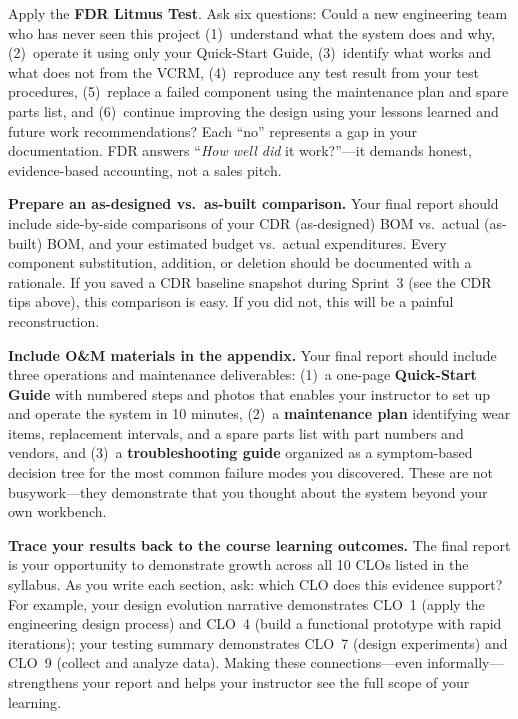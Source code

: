 \documentclass[11pt,letterpaper]{article}
\begin{document}
\begin{faqbox}
Apply the \textbf{FDR Litmus Test}. Ask six questions: Could a new engineering team who has never seen this project (1)~understand what the system does and why, (2)~operate it using only your Quick-Start Guide, (3)~identify what works and what does not from the VCRM, (4)~reproduce any test result from your test procedures, (5)~replace a failed component using the maintenance plan and spare parts list, and (6)~continue improving the design using your lessons learned and future work recommendations? Each ``no'' represents a gap in your documentation. FDR answers ``\textit{How well did} it work?''---it demands honest, evidence-based accounting, not a sales pitch.
\end{faqbox}

\begin{protip}
\textbf{Prepare an as-designed vs.\ as-built comparison.} Your final report should include side-by-side comparisons of your CDR (as-designed) BOM vs.\ actual (as-built) BOM, and your estimated budget vs.\ actual expenditures. Every component substitution, addition, or deletion should be documented with a rationale. If you saved a CDR baseline snapshot during Sprint~3 (see the CDR tips above), this comparison is easy. If you did not, this will be a painful reconstruction.
\end{protip}

\begin{tipbox}
\textbf{Include O\&M materials in the appendix.} Your final report should include three operations and maintenance deliverables: (1)~a one-page \textbf{Quick-Start Guide} with numbered steps and photos that enables your instructor to set up and operate the system in 10 minutes, (2)~a \textbf{maintenance plan} identifying wear items, replacement intervals, and a spare parts list with part numbers and vendors, and (3)~a \textbf{troubleshooting guide} organized as a symptom-based decision tree for the most common failure modes you discovered. These are not busywork---they demonstrate that you thought about the system beyond your own workbench.
\end{tipbox}

\begin{protip}
\textbf{Trace your results back to the course learning outcomes.} The final report is your opportunity to demonstrate growth across all 10 CLOs listed in the syllabus. As you write each section, ask: which CLO does this evidence support? For example, your design evolution narrative demonstrates CLO~1 (apply the engineering design process) and CLO~4 (build a functional prototype with rapid iterations); your testing summary demonstrates CLO~7 (design experiments) and CLO~9 (collect and analyze data). Making these connections---even informally---strengthens your report and helps your instructor see the full scope of your learning.
\end{protip}
\end{document}
